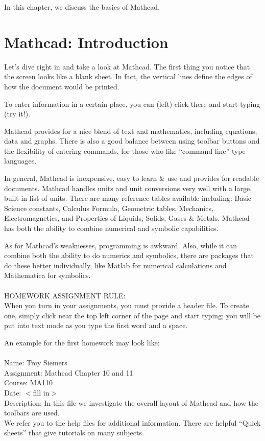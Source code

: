 In this chapter, we discuss the basics of Mathcad.

\section{Mathcad: Introduction}\label{sec:Mathcad_introduction}

Let's dive right in and take a look at Mathcad. The first thing you notice that the screen looks like a blank sheet.  In fact, the vertical lines define the edges of how the document would be printed.

To enter information in a certain place, you can (left) click there and start typing (try it!).

Mathcad provides for a nice blend of text and mathematics, including equations, data and graphs.  There is also a good balance between using toolbar buttons and the flexibility of entering commands, for those who like ``command line'' type languages.

In general, Mathcad is inexpensive, easy to learn \& use and provides for readable documents.  Mathcad handles units and unit conversions very well with a large, built-in list of units.  There are many reference tables available including: Basic Science constants, Calculus Formula, Geometric tables, Mechanics, Electromagnetics, and Properties of Liquids, Solids, Gases \& Metals.  Mathcad has both the ability to combine numerical and symbolic capabilities. 

As for Mathcad's weaknesses, programming is awkward.  Also, while it can combine both the ability to do numerics and symbolics, there are packages that do these better individually, like Matlab for numerical calculations and Mathematica for symbolics.\\
\\
HOMEWORK ASSIGNMENT RULE:\\

When you turn in your assignments, you must provide a header file.  To create one, simply click near the top left corner of the page and start typing; you will be put into text mode as you type the first word and a space.

An example for the first homework may look like:\\
\\
Name: Troy Siemers \\
Assignment: Mathcad Chapter 10 and 11\\
Course: MA110 \\
Date: $<$fill in$>$\\
Description: In this file we investigate the overall layout of Mathcad and how the toolbars are used.\\

We refer you to the help files for additional information.  There are helpful ``Quick sheets'' that give tutorials on many subjects.
%
%
%
